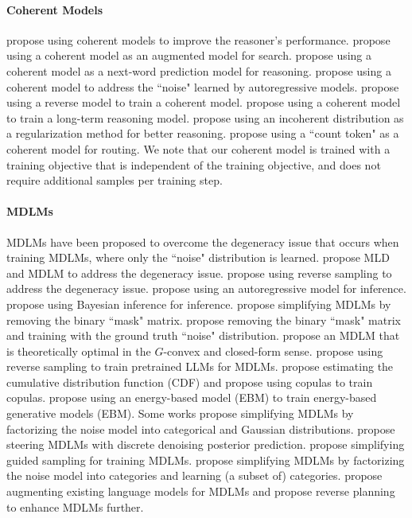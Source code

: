 \documentclass{article} %
\begin{document}
\paragraph{Coherent Models}
\citet{kitouni2024factorization,kim2024task,chen2024premise,lehnert2024beyond} propose using coherent models to improve the reasoner's performance. \citet{kim2024task,lehnert2024beyond} propose using a coherent model as an augmented model for search. \citet{chen2024premise} propose using a coherent model as a next-word prediction model for reasoning. \citet{kitouni2024factorization} propose using a coherent model to address the ``noise" learned by autoregressive models. \citet{golovneva2024reverse, shah2024causal} propose using a reverse model to train a coherent model. \citet{chen2024reverse} propose using a coherent model to train a long-term reasoning model. \citet{shi2025simplified} propose using an incoherent distribution as a regularization method for better reasoning. \citet{chuang2024learning} propose using a ``count token" as a coherent model for routing. We note that our coherent model is trained with a training objective that is independent of the training objective, and does not require additional samples per training step. 

\paragraph{MDLMs}
MDLMs have been proposed to overcome the degeneracy issue that occurs when training MDLMs, where only the ``noise" distribution is learned. \citet{austin2023structured} propose MLD and MDLM to address the degeneracy issue. \citet{shih2022training} propose using reverse sampling to address the degeneracy issue. \citet{zheng2024maskeddiffusionmodelssecretly,NEURIPS2024_c153077e} propose using an autoregressive model for inference. \citet{varma2024glauber} propose using Bayesian inference for inference. \citet{shi2025simplified} propose simplifying MDLMs by removing the binary ``mask" matrix. \citet{kitouni2024factorization} propose removing the binary ``mask" matrix and training with the ground truth ``noise" distribution. \citet{zheng2024reparameterized} propose an MDLM that is theoretically optimal in the $G$-convex and closed-form sense. \citet{touvron2023llama2} propose using reverse sampling to train pretrained LLMs for MDLMs. \citet{lou2024discrete} propose estimating the cumulative distribution function (CDF) and \citet{liu2024copula} propose using copulas to train copulas. \citet{xu2024energy} propose using an energy-based model (EBM) to train energy-based generative models (EBM). Some works propose simplifying MDLMs by factorizing the noise model into categorical and Gaussian distributions.  \citet{rectorbrooks2024steering} propose steering MDLMs with discrete denoising posterior prediction. \citet{schiff2024simple} propose simplifying guided sampling for training MDLMs. \citet{sahoo2024simple} propose simplifying MDLMs by factorizing the noise model into categories and learning (a subset of) categories. \citet{ye2024beyond} propose augmenting existing language models for MDLMs and propose reverse planning to enhance MDLMs further. 
\end{document}
